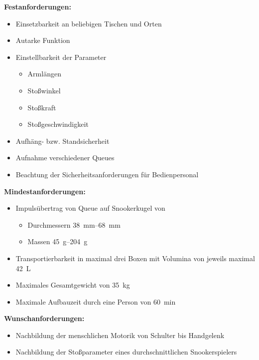 		\textbf{Festanforderungen:}
		\begin{itemize}
			\item Einsetzbarkeit an beliebigen Tischen und Orten
			\item Autarke Funktion
			\item Einstellbarkeit der Parameter
			\begin{itemize}
				\item Armlängen
				\item Stoßwinkel
				\item Stoßkraft
				\item Stoßgeschwindigkeit
			\end{itemize}
			\item Aufhäng- bzw. Standsicherheit
			\item Aufnahme verschiedener Queues
			\item Beachtung der Sicherheitsanforderungen für Bedienpersonal
		\end{itemize}

		\textbf{Mindestanforderungen:}
		\begin{itemize}
			\item Impulsübertrag von Queue auf Snookerkugel von
			\begin{itemize}
				\item Durchmessern \SIrange{38}{68}{\milli\metre}
				\item Massen \SIrange{45}{204}{\gram}
			\end{itemize}
			\item Transportierbarkeit in maximal drei Boxen mit Volumina von jeweils maximal \SI{42}{L}
			\item Maximales Gesamtgewicht von \SI{35}{\kilo\gram}
			\item Maximale Aufbauzeit durch eine Person von \SI{60}{\minute}
		\end{itemize}

		\textbf{Wunschanforderungen:}
		\begin{itemize}
			\item Nachbildung der menschlichen Motorik von Schulter bis Handgelenk
			\item Nachbildung der Stoßparameter eines durchschnittlichen Snookerspielers
		\end{itemize}
